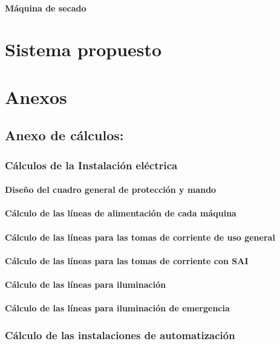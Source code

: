 	\paragraph{Máquina de secado}
	

\section{Sistema propuesto}

\section{Anexos}

   
\subsection{Anexo de cálculos:}

\subsubsection{Cálculos de la Instalación eléctrica}
\paragraph{Diseño del cuadro general de protección y mando}
\paragraph{Cálculo de las líneas de alimentación de cada máquina}
\paragraph{Cálculo de las líneas para las tomas de corriente de uso general}
\paragraph{Cálculo de las líneas para las tomas de corriente con SAI}
\paragraph{Cálculo de las líneas para iluminación}
\paragraph{Cálculo de las líneas para iluminación de emergencia}

\subsubsection{Cálculo de las instalaciones de automatización}
